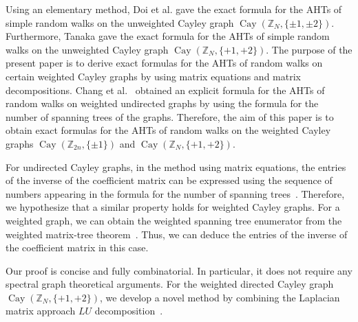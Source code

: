 \documentclass[12pt, leqno]{amsart}
\numberwithin{equation}{section}
\theoremstyle{plain}
\newtheorem{thm}{Theorem}[section]
\theoremstyle{definition}
\newcommand{\ZZ}{\mathbb{Z}}
\newcommand{\0}{\mathbf{0}}
\DeclareMathOperator{\Cay}{Cay}
\begin{document}
Using an elementary method, Doi et al. \cite{HT} gave the exact formula for the AHTs of simple random walks on the unweighted Cayley graph $\Cay(\ZZ_N,\{\pm1,\pm2\})$.%
Furthermore, Tanaka \cite{YT2024} gave the exact formula for the AHTs of simple random walks on the unweighted Cayley graph $\Cay(\ZZ_N,\{+1,+2\})$.%
The purpose of the present paper is to derive exact formulas for the AHTs of random walks on certain weighted Cayley graphs by using matrix equations and matrix decompositions.
Chang et al.~\cite{XHS} obtained an explicit formula for the AHTs of random walks on weighted undirected graphs by using the formula for the number of spanning trees of the graphs.
Therefore, the aim of this paper is to obtain exact formulas for the AHTs of random walks on the weighted Cayley graphs $\Cay(\ZZ_{2n},\{\pm1\})$ and $\Cay(\ZZ_N,\{+1,+2\})$. 

For undirected Cayley graphs, in the method using matrix equations, the entries of the inverse of the coefficient matrix can be expressed using the sequence of numbers appearing in the formula for the number of spanning trees~\cite{HT, Kleitman}.
Therefore, we hypothesize that a similar property holds for weighted Cayley graphs.
For a weighted graph, we can obtain the weighted spanning tree enumerator from the weighted matrix-tree theorem~\cite{Kirchhoff, KS}.
Thus, we can deduce the entries of the inverse of the coefficient matrix in this case.

Our proof is concise and fully combinatorial.
In particular, it does not require any spectral graph theoretical arguments.
For the weighted directed Cayley graph $\Cay(\ZZ_N,\{+1,+2\})$, 
we develop a novel method by combining the Laplacian matrix approach $LU$ decomposition~\cite{Horn}.
\end{document}

